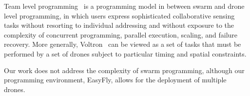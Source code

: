 Team level programming~\cite{mottola2014team} is a programming model in between swarm and drone level programming, 
in which users express sophisticated collaborative sensing tasks without resorting to individual addressing 
and without exposure to the complexity of concurrent programming, parallel execution, scaling, and failure recovery.
More generally, Voltron~\cite{mottola2014team} can be viewed as a set of tasks that must be performed by a set of drones subject to particular timing and spatial constraints.

Our work does not address the complexity of swarm programming, although our programming environment, EasyFly, allows for the deployment of multiple drones. 
